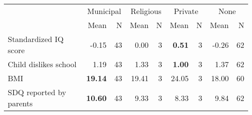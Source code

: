 \begin{tabular}{l r r r r r r r r}
\toprule
& \multicolumn{2}{c}{Municipal} & \multicolumn{2}{c}{Religious} & \multicolumn{2}{c}{Private} & \multicolumn{2}{c}{None} \\
& \scriptsize Mean & \scriptsize N & \scriptsize Mean & \scriptsize N & \scriptsize Mean & \scriptsize N & \scriptsize Mean & \scriptsize N \\
\midrule
Standardized IQ score &     -0.15 &        43 &      0.00 &         3 & \textbf{     0.51} &         3 &     -0.26 &        62 \\
Child dislikes school &      1.19 &        43 &      1.33 &         3 & \textbf{     1.00} &         3 &      1.37 &        62 \\
BMI & \textbf{    19.14} &        43 &     19.41 &         3 &     24.05 &         3 &     18.00 &        60 \\
SDQ reported by parents & \textbf{    10.60} &        43 &      9.33 &         3 &      8.33 &         3 &      9.84 &        62 \\
\bottomrule
\end{tabular}
